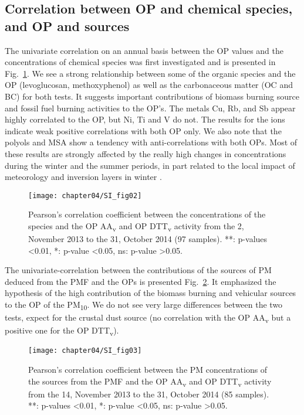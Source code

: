 \subsection{Correlation between OP and chemical species, and OP and
sources}\label{si-2-correlation-between-op-and-chemical-species-and-op-and-sources}

The univariate correlation on an annual basis between the OP values and the
concentrations of chemical species was first investigated and is presented in
Fig.~\ref{fig:pearsonrChem}. We see a strong relationship between some of the
organic species and the OP (levoglucosan, methoxyphenol) as well as the
carbonaceous matter (OC and BC) for both tests. It suggests important
contributions of biomass burning source and fossil fuel burning activities to
the OP's. The metals Cu, Rb, and Sb appear highly correlated to the OP, but Ni,
Ti and V do not. The results for the ions indicate weak positive correlations
with both OP only. We also note that the polyols and MSA show a tendency with
anti-correlations with both OPs. Most of these results are strongly affected by
the really high changes in concentrations during the winter and the summer
periods, in part related to the local impact of meteorology and inversion layers
in winter \parencite{calasComparison2018}.

\begin{figure}[h]
    \centering
    \texttt{[image: chapter04/SI\_fig02]}
    \caption{Pearson's correlation coefficient between the concentrations of the
        species and the OP AA\textsubscript{v} and OP DTT\textsubscript{v}
        activity from the 2, November 2013 to the 31, October 2014 (97 samples).
        **: p-values \textless{}0.01, *: p-value \textless{}0.05, ns: p-value
    \textgreater{}0.05.}
    \label{fig:pearsonrChem}
\end{figure}

The univariate-correlation between the contributions of the sources of PM
deduced from the PMF and the OPs is presented Fig.~\ref{fig:pearsonrSrc}. It
emphasized the hypothesis of the high contribution of the biomass burning and
vehicular sources to the OP of the PM\textsubscript{10}. We do not see very
large differences between the two tests, expect for the crustal dust source (no
correlation with the OP AA\textsubscript{v} but a positive one for the OP
DTT\textsubscript{v}).

\begin{figure}[h]
    \centering
    \texttt{[image: chapter04/SI\_fig03]}
    \caption{Pearson's correlation coefficient between the PM concentrations of
        the sources from the PMF and the OP AA\textsubscript{v} and OP
        DTT\textsubscript{v} activity from the 14, November 2013 to the 31,
        October 2014 (85 samples). **: p-values \textless{}0.01, *: p-value
    \textless{}0.05, ns: p-value \textgreater{}0.05.}
    \label{fig:pearsonrSrc}
\end{figure}



\clearpage


\printbibliography[segment=\therefsegment,heading=subbibliography]
